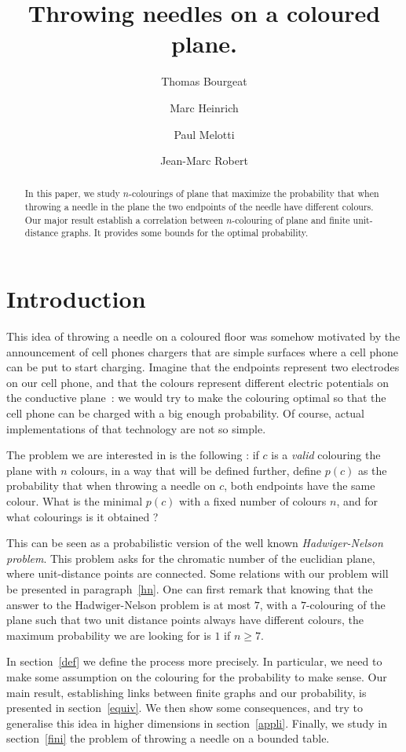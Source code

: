 \documentclass[a4paper,11pt]{article}
\title{Throwing needles on a coloured plane.}
\author{Thomas Bourgeat \and Marc Heinrich \and Paul Melotti 
\and Jean-Marc Robert}
\theoremstyle{definition}
\theoremstyle{remark}
\begin{document}
\maketitle

\begin{abstract}  In this paper, we study $n$-colourings of plane 
that maximize the probability that when throwing a needle in the plane the two 
endpoints of the needle have different colours. Our major result establish a 
correlation between $n$-colouring of plane and finite unit-distance graphs. 
It provides some bounds for the optimal probability.\end{abstract}

\section{Introduction}
This idea of throwing a needle on a coloured floor was somehow motivated by 
the announcement of cell phones chargers that are simple surfaces where a cell 
phone can be put to start charging. Imagine that the endpoints 
represent two electrodes on our cell phone, and that the colours represent 
different electric potentials on the conductive plane~: we would try to make 
the colouring optimal so that the cell phone can be charged with a big enough 
probability. Of course, actual implementations of that technology are not so 
simple.

The problem we are interested in is the following : if $c$ is a 
\emph{valid} colouring the plane with $n$ colours, in a  way that will be 
defined further, define $p(c)$ as the probability that when throwing a needle 
on $c$, both endpoints have the same colour. What is the minimal $p(c)$ with a 
fixed number of colours $n$, and for what colourings is it obtained ?

This can be seen as a probabilistic version of the well known 
\emph{Hadwiger-Nelson problem}. This problem asks for the chromatic number 
of the euclidian plane, where unit-distance points are connected. Some 
relations with our problem will be presented in paragraph~\ref{hn}. One can 
first remark that knowing that the answer to the Hadwiger-Nelson problem is at 
most $7$, with a $7$-colouring of the plane such that two unit distance points 
always have different colours, the maximum probability we are looking for is 
$1$ if $n \geq 7$.

In section~\ref{def} we define the process more precisely. In particular, we 
need to make some assumption on the colouring for the probability to make 
sense. Our main result, establishing links between finite graphs and our 
probability, is presented in section~\ref{equiv}. We then show some 
consequences, and try to generalise this idea in higher dimensions in
section~\ref{appli}. Finally, we study in section~\ref{fini} the problem of 
throwing a needle on a bounded table.
\end{document}
